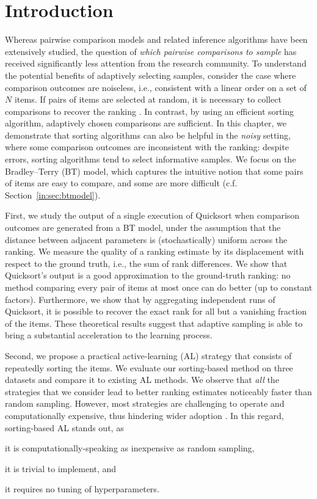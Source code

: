 \section{Introduction}  %
\label{rs:sec:intro}

Whereas pairwise comparison models and related inference algorithms have been extensively studied, the question of \emph{which pairwise comparisons to sample} has received significantly less attention from the research community.
To understand the potential benefits of adaptively selecting samples, consider the case where comparison outcomes are noiseless, i.e., consistent with a linear order on a set of $N$ items.
If pairs of items are selected at random, it is necessary to collect  comparisons to recover the ranking \citep{alon1994linear}.
In contrast, by using an efficient sorting algorithm,  adaptively chosen comparisons are sufficient.
In this chapter, we demonstrate that sorting algorithms can also be helpful in the \emph{noisy} setting, where some comparison outcomes are inconsistent with the ranking: despite errors, sorting algorithms tend to select informative samples.
We focus on the Bradley--Terry (BT) model, which captures the intuitive notion that some pairs of items are easy to compare, and some are more difficult (c.f. Section~\ref{in:sec:btmodel}).

First, we study the output of a single execution of Quicksort when comparison outcomes are generated from a BT model, under the assumption that the distance between adjacent parameters is (stochastically) uniform across the ranking.
We measure the quality of a ranking estimate by its displacement with respect to the ground truth, i.e., the sum of rank differences.
We show that Quicksort's output is a good approximation to the ground-truth ranking: no method comparing every pair of items at most once can do better (up to constant factors).
Furthermore, we show that by aggregating  independent runs of Quicksort, it is possible to recover the exact rank for all but a vanishing fraction of the items.
These theoretical results suggest that adaptive sampling is able to bring a substantial acceleration to the learning process.

Second, we propose a practical active-learning (AL) strategy that consists of repeatedly sorting the items.
We evaluate our sorting-based method on three datasets and compare it to existing AL methods.
We observe that \emph{all} the strategies that we consider lead to better ranking estimates noticeably faster than random sampling.
However, most strategies are challenging to operate and computationally expensive, thus hindering wider adoption \citep{schein2007active}.
In this regard, sorting-based AL stands out, as
\begin{enuminline}
\item it is computationally-speaking as inexpensive as random sampling, 
\item it is trivial to implement, and
\item it requires no tuning of hyperparameters.
\end{enuminline}

